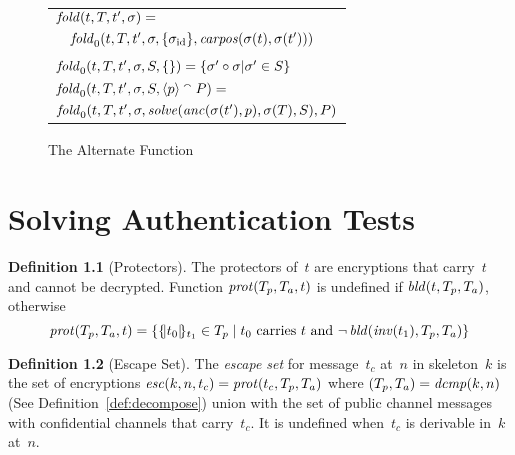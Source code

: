 \documentclass[12pt]{report}
\theoremstyle{definition}
\newtheorem{defn}{Definition}[chapter]
\begin{document}
\begin{figure}
\begin{center}
\begin{tabular}{l}
$\operatorname{\mathit{fold}}(t,T,t',\sigma)={}$\\
$\quad\operatorname{\mathit{fold}}_0(t,T,t',\sigma,\{\sigma_{\mathrm{id}}\},\operatorname{\mathit{carpos}}(\sigma(t), \sigma(t')))$\\
\\
$\operatorname{\mathit{fold}}_0(t,T,t',\sigma,S,\{\})=\{\sigma' \circ \sigma | \sigma' \in S\}$\\
$\operatorname{\mathit{fold}}_0(t,T,t',\sigma,S,\langle p\rangle \mathbin{{}^\smallfrown} P)={}$\\
\quad
$\operatorname{\mathit{fold}}_0(t,T,t',\sigma,\operatorname{\mathit{solve}}(\operatorname{\mathit{anc}}(\sigma(t'),p),\sigma(T),S),P)$\\
\end{tabular}
\end{center}
\caption{The Alternate  Function}\label{fig:fold}
\end{figure}

\chapter{Solving Authentication Tests}\label{chp:auth tests}

\begin{defn}[Protectors]
The protectors of~$t$ are encryptions that carry~$t$
and cannot be decrypted.  Function $\operatorname{\mathit{prot}}(T_p,T_a,t)$ is undefined
if $\operatorname{\mathit{bld}}(t,T_p,T_a)$, otherwise
\[\operatorname{\mathit{prot}}(T_p,T_a,t)=\{\{\!|t_0|\!\}_{t_1}\in T_p\mid
\mbox{$t_0$ carries $t$ and }\lnot\operatorname{\mathit{bld}}(\operatorname{\mathit{inv}}(t_1),T_p,T_a)\}\]
\end{defn}

\begin{defn}[Escape Set]
The \emph{escape set} for message~$t_c$ at~$n$ in
skeleton~$k$ is the set of encryptions
$\operatorname{\mathit{esc}}(k,n,t_c)=\operatorname{\mathit{prot}}(t_c,T_p,T_a)$ where
$(T_p,T_a)=\operatorname{\mathit{dcmp}}(k,n)$ (See Definition~\ref{def:decompose}) union
with the set of public channel messages with confidential channels
that carry~$t_c$.  It is undefined when~$t_c$ is derivable in~$k$
at~$n$.
\end{defn}
\end{document}
